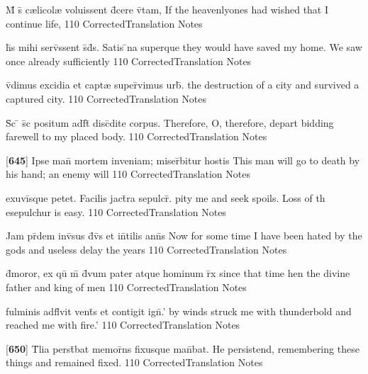\latline
  {M\={} s\={\macron {\i}} c{\ae}licol{\ae} voluissent d\={}cere v\={\macron {\i}}tam,}
  { If the heavenlyones had wished that I continue life, }
  {110}
  { CorrectedTranslation }
  { Notes }


\latline
  {h\={}s mihi serv\={}ssent s\={}d\={}s.  Satis \={}na superque}
  { they would have saved my home.  We saw once already sufficiently }
  {110}
  { CorrectedTranslation }
  { Notes }


\latline
  {v\={\macron {\i}}dimus excidia et capt{\ae} super\={}vimus urb\={\macron {\i}}.}
  { the destruction of a city and survived a captured city. }
  {110}
  { CorrectedTranslation }
  { Notes }


\latline
  {S\={\macron {\i}}c \={} s\={\macron {\i}}c positum adf\={}t\={\macron {\i}} disc\={}dite corpus.}
  { Therefore, O, therefore, depart bidding farewell to my placed body. }
  {110}
  { CorrectedTranslation }
  { Notes }


\latline
  {[\textbf{645}] Ipse man\={} mortem inveniam; miser\={}bitur hostis}
  { This man will go to death by his hand; an enemy will }
  {110}
  { CorrectedTranslation }
  { Notes }


\latline
  {exuvi\={}sque petet.  Facilis jact\={}ra sepulcr\={\macron {\i}}.}
  { pity me and seek spoils.  Loss of th esepulchur is easy. }
  {110}
  { CorrectedTranslation }
  { Notes }


\latline
  {Jam pr\={\macron {\i}}dem inv\={\macron {\i}}sus d\={\macron {\i}}v\={\macron {\i}}s et in\={}tilis ann\={}s}
  { Now for some time I have been hated by the gods and useless delay the years }
  {110}
  { CorrectedTranslation }
  { Notes }


\latline
  {d\={}moror, ex qu\={} m\={} d\={\macron {\i}}vum pater atque hominum r\={}x}
  { since that time hen the divine father and king of men  }
  {110}
  { CorrectedTranslation }
  { Notes }


\latline
  {fulminis adfl\={}vit vent\={\macron {\i}}s et contigit ign\={\macron {\i}}.'}
  { by winds struck me with thunderbold and reached me with fire.' }
  {110}
  { CorrectedTranslation }
  { Notes }

\latline
  {[\textbf{650}]  T\={}lia perst\={}bat memor\={}ns fixusque man\={}bat.}
  { He persistend, remembering these things and remained fixed. }
  {110}
  { CorrectedTranslation }
  { Notes }





